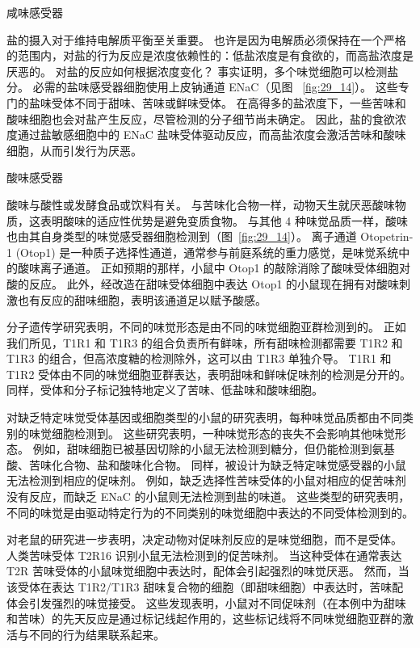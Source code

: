 咸味感受器

盐的摄入对于维持电解质平衡至关重要。
也许是因为电解质必须保持在一个严格的范围内，对盐的行为反应是浓度依赖性的：低盐浓度是有食欲的，而高盐浓度是厌恶的。
对盐的反应如何根据浓度变化？
事实证明，多个味觉细胞可以检测盐分。
必需的盐味感受器细胞使用上皮钠通道 ENaC（见图 ~\ref{fig:29_14}）。
这些专门的盐味受体不同于甜味、苦味或鲜味受体。
在高得多的盐浓度下，一些苦味和酸味细胞也会对盐产生反应，尽管检测的分子细节尚未确定。
因此，盐的食欲浓度通过盐敏感细胞中的 ENaC 盐味受体驱动反应，而高盐浓度会激活苦味和酸味细胞，从而引发行为厌恶。



酸味感受器

酸味与酸性或发酵食品或饮料有关。
与苦味化合物一样，动物天生就厌恶酸味物质，这表明酸味的适应性优势是避免变质食物。
与其他 4 种味觉品质一样，酸味也由其自身类型的味觉感受器细胞检测到（图~\ref{fig:29_14}）。
离子通道 Otopetrin-1 (Otop1) 是一种质子选择性通道，通常参与前庭系统的重力感觉，是味觉系统中的酸味离子通道。
正如预期的那样，小鼠中 Otop1 的敲除消除了酸味受体细胞对酸的反应。
此外，经改造在甜味受体细胞中表达 Otop1 的小鼠现在拥有对酸味刺激也有反应的甜味细胞，表明该通道足以赋予酸感。


分子遗传学研究表明，不同的味觉形态是由不同的味觉细胞亚群检测到的。
正如我们所见，T1R1 和 T1R3 的组合负责所有鲜味，所有甜味检测都需要 T1R2 和 T1R3 的组合，但高浓度糖的检测除外，这可以由 T1R3 单独介导。
T1R1 和 T1R2 受体由不同的味觉细胞亚群表达，表明甜味和鲜味促味剂的检测是分开的。
同样，受体和分子标记独特地定义了苦味、低盐味和酸味细胞。


对缺乏特定味觉受体基因或细胞类型的小鼠的研究表明，每种味觉品质都由不同类别的味觉细胞检测到。
这些研究表明，一种味觉形态的丧失不会影响其他味觉形态。
例如，甜味细胞已被基因切除的小鼠无法检测到糖分，但仍能检测到氨基酸、苦味化合物、盐和酸味化合物。
同样，被设计为缺乏特定味觉感受器的小鼠无法检测到相应的促味剂。
例如，缺乏选择性苦味受体的小鼠对相应的促苦味剂没有反应，而缺乏 ENaC 的小鼠则无法检测到盐的味道。
这些类型的研究表明，不同的味觉是由驱动特定行为的不同类别的味觉细胞中表达的不同受体检测到的。


对老鼠的研究进一步表明，决定动物对促味剂反应的是味觉细胞，而不是受体。
人类苦味受体 T2R16 识别小鼠无法检测到的促苦味剂。
当这种受体在通常表达 T2R 苦味受体的小鼠味觉细胞中表达时，配体会引起强烈的味觉厌恶。
然而，当该受体在表达 T1R2/T1R3 甜味复合物的细胞（即甜味细胞）中表达时，苦味配体会引发强烈的味觉接受。
这些发现表明，小鼠对不同促味剂（在本例中为甜味和苦味）的先天反应是通过标记线起作用的，这些标记线将不同味觉细胞亚群的激活与不同的行为结果联系起来。



